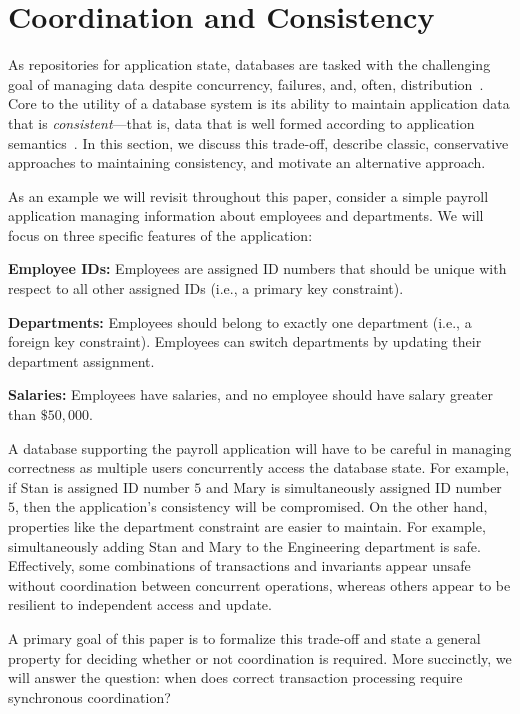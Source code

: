 
\section{Coordination and Consistency}
\label{sec:motivation}


As repositories for application state, databases are tasked with the
challenging goal of managing data despite concurrency, failures, and,
often, distribution~\cite{bernstein-book}. Core to the utility of a
database system is its ability to maintain application data that is
\textit{consistent}---that is, data that is well formed according to
application semantics~\cite{gray-virtues}. In this section, we discuss
this trade-off, describe classic, conservative approaches to
maintaining consistency, and motivate an alternative approach.

 As an example we will revisit throughout
this paper, consider a simple payroll application managing information
about employees and departments. We will focus on three specific
features of the application:
\begin{myitemize}
\item\textbf{Employee IDs:} Employees are assigned ID numbers that
  should be unique with respect to all other assigned IDs (i.e., a
  primary key constraint).
  \item\textbf{Departments:} Employees should belong to exactly one
  department (i.e., a foreign key constraint). Employees can switch
  departments by updating their department assignment.
\item\textbf{Salaries:} Employees have salaries, and no employee
  should have salary greater than $\$50,000$.
\end{myitemize}
A database supporting the payroll application will have to be careful
in managing correctness as multiple users concurrently access the
database state. For example, if Stan is assigned ID number $5$ and
Mary is simultaneously assigned ID number $5$, then the application's
consistency will be compromised. On the other hand, properties like
the department constraint are easier to maintain. For example,
simultaneously adding Stan and Mary to the Engineering department is
safe. Effectively, some combinations of transactions and invariants
appear unsafe without coordination between concurrent operations,
whereas others appear to be resilient to independent access and
update.

A primary goal of this paper is to formalize this trade-off and state
a general property for deciding whether or not coordination is
required. More succinctly, we will answer the question: when does
correct transaction processing require synchronous coordination?

